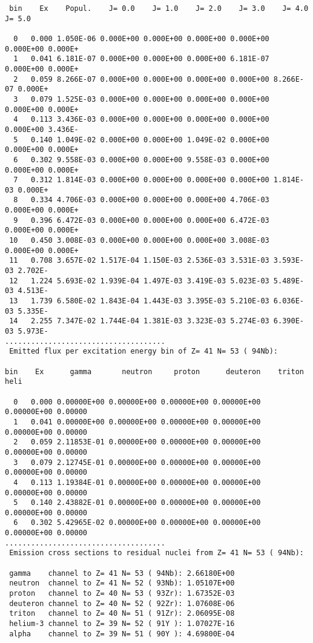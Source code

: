 \begin{samplecase}
{\begin{verbatim}
 bin    Ex    Popul.    J= 0.0    J= 1.0    J= 2.0    J= 3.0    J= 4.0    J= 5.0

  0   0.000 1.050E-06 0.000E+00 0.000E+00 0.000E+00 0.000E+00 0.000E+00 0.000E+
  1   0.041 6.181E-07 0.000E+00 0.000E+00 0.000E+00 6.181E-07 0.000E+00 0.000E+
  2   0.059 8.266E-07 0.000E+00 0.000E+00 0.000E+00 0.000E+00 8.266E-07 0.000E+
  3   0.079 1.525E-03 0.000E+00 0.000E+00 0.000E+00 0.000E+00 0.000E+00 0.000E+
  4   0.113 3.436E-03 0.000E+00 0.000E+00 0.000E+00 0.000E+00 0.000E+00 3.436E-
  5   0.140 1.049E-02 0.000E+00 0.000E+00 1.049E-02 0.000E+00 0.000E+00 0.000E+
  6   0.302 9.558E-03 0.000E+00 0.000E+00 9.558E-03 0.000E+00 0.000E+00 0.000E+
  7   0.312 1.814E-03 0.000E+00 0.000E+00 0.000E+00 0.000E+00 1.814E-03 0.000E+
  8   0.334 4.706E-03 0.000E+00 0.000E+00 0.000E+00 4.706E-03 0.000E+00 0.000E+
  9   0.396 6.472E-03 0.000E+00 0.000E+00 0.000E+00 6.472E-03 0.000E+00 0.000E+
 10   0.450 3.008E-03 0.000E+00 0.000E+00 0.000E+00 3.008E-03 0.000E+00 0.000E+
 11   0.708 3.657E-02 1.517E-04 1.150E-03 2.536E-03 3.531E-03 3.593E-03 2.702E-
 12   1.224 5.693E-02 1.939E-04 1.497E-03 3.419E-03 5.023E-03 5.489E-03 4.513E-
 13   1.739 6.580E-02 1.843E-04 1.443E-03 3.395E-03 5.210E-03 6.036E-03 5.335E-
 14   2.255 7.347E-02 1.744E-04 1.381E-03 3.323E-03 5.274E-03 6.390E-03 5.973E-
.....................................
 Emitted flux per excitation energy bin of Z= 41 N= 53 ( 94Nb):
   
bin    Ex      gamma       neutron     proton      deuteron    triton      heli

  0   0.000 0.00000E+00 0.00000E+00 0.00000E+00 0.00000E+00 0.00000E+00 0.00000
  1   0.041 0.00000E+00 0.00000E+00 0.00000E+00 0.00000E+00 0.00000E+00 0.00000
  2   0.059 2.11853E-01 0.00000E+00 0.00000E+00 0.00000E+00 0.00000E+00 0.00000
  3   0.079 2.12745E-01 0.00000E+00 0.00000E+00 0.00000E+00 0.00000E+00 0.00000
  4   0.113 1.19384E-01 0.00000E+00 0.00000E+00 0.00000E+00 0.00000E+00 0.00000
  5   0.140 2.43882E-01 0.00000E+00 0.00000E+00 0.00000E+00 0.00000E+00 0.00000
  6   0.302 5.42965E-02 0.00000E+00 0.00000E+00 0.00000E+00 0.00000E+00 0.00000
.....................................
 Emission cross sections to residual nuclei from Z= 41 N= 53 ( 94Nb):
   
 gamma    channel to Z= 41 N= 53 ( 94Nb): 2.66180E+00
 neutron  channel to Z= 41 N= 52 ( 93Nb): 1.05107E+00
 proton   channel to Z= 40 N= 53 ( 93Zr): 1.67352E-03
 deuteron channel to Z= 40 N= 52 ( 92Zr): 1.07608E-06
 triton   channel to Z= 40 N= 51 ( 91Zr): 2.06095E-08
 helium-3 channel to Z= 39 N= 52 ( 91Y ): 1.07027E-16
 alpha    channel to Z= 39 N= 51 ( 90Y ): 4.69800E-04
   

\end{verbatim}}
\end{samplecase}
